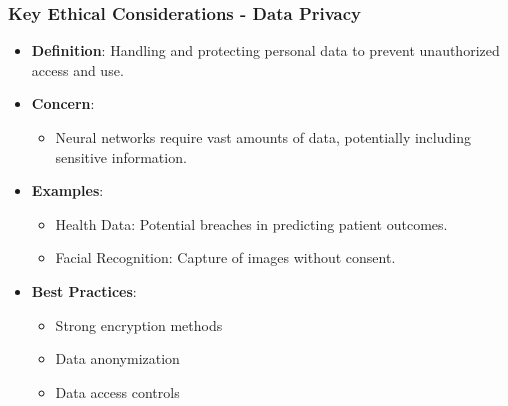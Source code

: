 \documentclass[aspectratio=169]{beamer}
\begin{document}
\begin{frame}[fragile]
    \frametitle{Key Ethical Considerations - Data Privacy}
    \begin{itemize}
        \item \textbf{Definition}: Handling and protecting personal data to prevent unauthorized access and use.
        \item \textbf{Concern}: 
        \begin{itemize}
            \item Neural networks require vast amounts of data, potentially including sensitive information.
        \end{itemize}
        \item \textbf{Examples}:
        \begin{itemize}
            \item Health Data: Potential breaches in predicting patient outcomes.
            \item Facial Recognition: Capture of images without consent.
        \end{itemize}
        \item \textbf{Best Practices}:
        \begin{itemize}
            \item Strong encryption methods
            \item Data anonymization 
            \item Data access controls
        \end{itemize}
    \end{itemize}
\end{frame}
\end{document}
